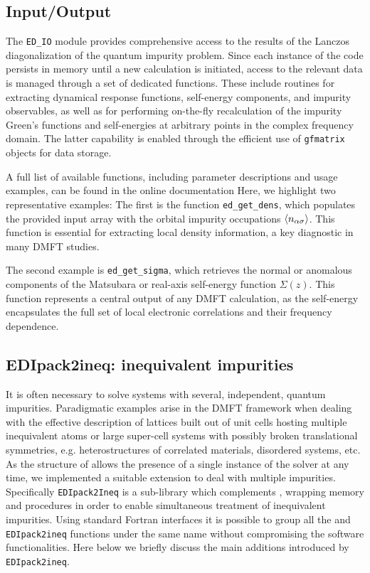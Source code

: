 \documentclass[edipack2.tex]{subfiles}
\begin{document}
\subsection{Input/Output}\label{sSecIO}
The \texttt{ED\_IO} module provides comprehensive access to the 
results of the Lanczos diagonalization of the quantum impurity 
problem. Since each instance of the code persists in memory until a 
new calculation is initiated, access to the relevant data is managed 
through a set of dedicated functions. These include routines for 
extracting dynamical response functions, self-energy components, and 
impurity observables, as well as for performing on-the-fly 
recalculation of the impurity Green's functions and self-energies at 
arbitrary points in the complex frequency domain. The latter 
capability is enabled through the efficient use of \texttt{gfmatrix} 
objects for data storage.

A full list of available functions, including parameter descriptions 
and usage examples, can be found in the online documentation 
Here, we highlight two representative examples:
The first is the function \texttt{ed\_get\_dens}, which populates the 
provided input array with the orbital impurity occupations 
$\langle n_{\alpha\sigma}\rangle$. This function is essential for extracting 
local density information, a key diagnostic in many DMFT studies.

The second example is \texttt{ed\_get\_sigma}, which retrieves the 
normal or anomalous components of the Matsubara or real-axis 
self-energy function $\Sigma(z)$. This function represents a central 
output of any DMFT calculation, as the self-energy encapsulates the 
full set of local electronic correlations and their frequency 
dependence.







\subsection{EDIpack2ineq: inequivalent impurities}\label{sSecIneq}
It is often necessary to solve systems with several, independent,
quantum impurities. Paradigmatic examples arise in the DMFT
framework when dealing with the effective description of lattices
built out of unit cells hosting multiple inequivalent atoms or large
super-cell systems with possibly broken translational symmetries,
e.g. heterostructures of correlated materials, disordered systems,
etc.
As the structure of \NAME allows the presence of a single instance of
the solver at any time, we implemented a suitable extension to deal
with multiple impurities. Specifically {\tt EDIpack2Ineq} is a
sub-library which complements \NAME, wrapping memory and procedures in
order to enable simultaneous treatment of  inequivalent impurities. 
Using standard Fortran interfaces it is possible to group all the
\NAME and {\tt EDIpack2ineq} functions under the same name without
compromising the software functionalities.  
Here below we briefly discuss the main additions introduced by {\tt
  EDIpack2ineq}. 
\end{document}
